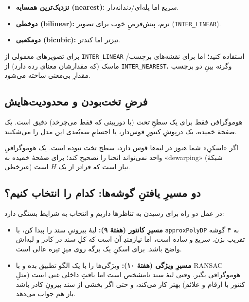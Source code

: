 \documentclass[12pt,a4paper]{article}
\begin{document}
\begin{itemize}
  \item \textbf{نزدیک‌ترین همسایه (nearest):} سریع اما پله‌ای/دندانه‌دار.
  \item \textbf{دوخطی (bilinear):} نرم، پیش‌فرضِ خوب برای تصویر (\texttt{INTER\_LINEAR}).
  \item \textbf{دومکعبی (bicubic):} تیزتر اما کندتر.
\end{itemize}

\begin{nokte}
برای تصویرهای معمولی از \texttt{INTER\_LINEAR} استفاده کنید؛ اما برای نقشه‌های برچسب/ماسک (که مقدارشان معنای رده دارد) از \texttt{INTER\_NEAREST}، وگرنه بینِ دو برچسب مقدارِ بی‌معنی ساخته می‌شود.
\end{nokte}

\subsection{فرضِ تخت‌بودن و محدودیت‌هایش}

هوموگرافی فقط برای یک سطحِ \emph{تخت} (یا دوربینی که فقط می‌چرخد) دقیق است. یک صفحهٔ خمیده، یک درپوشِ کنتورِ قوس‌دار، یا اجسامِ سه‌بُعدی این مدل را می‌شکنند.

\begin{hoshdar}
اگر «اسکنِ» شما هنوز در لبه‌ها قوس دارد، سطح تخت نبوده است. یک هوموگرافیِ واحد نمی‌تواند انحنا را تصحیح کند؛ برای صفحهٔ خمیده به «dewarping» (شبکهٔ غیرخطی) نیاز است که فراتر از یک $H$ است.
\end{hoshdar}

\subsection{دو مسیرِ یافتنِ گوشه‌ها: کدام را انتخاب کنیم؟}

در عمل دو راه برای رسیدن به تناظرها داریم و انتخاب به شرایط بستگی دارد:

\begin{itemize}
  \item \textbf{مسیرِ کانتور (هفتهٔ ۹):} لبهٔ بیرونیِ سند را پیدا کن، با \texttt{approxPolyDP} به ۴ گوشه تقریب بزن. سریع و ساده است، اما نیازمندِ آن است که کلِ سند در کادر و لبه‌اش واضح باشد. برای اسکنِ یک برگه روی میزِ تیره عالی است.
  \item \textbf{مسیرِ ویژگی (هفتهٔ ۱۰):} ویژگی‌ها را با یک الگو تطبیق بده و با RANSAC هوموگرافی بگیر. وقتی لبهٔ سند نامشخص است اما بافتِ داخلی غنی است (مثلِ کنتور با ارقام و علائم) بهتر کار می‌کند، و حتی اگر بخشی از سند بیرونِ کادر باشد باز هم جواب می‌دهد.
\end{itemize}
\end{document}

